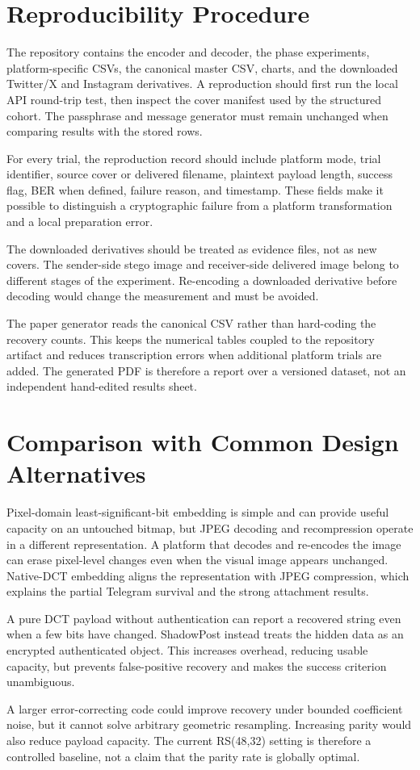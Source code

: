 \documentclass[conference]{IEEEtran}
\newcommand{\safeSection}[1]{\Needspace{5\baselineskip}\section{#1}}
\begin{document}
\safeSection{Reproducibility Procedure}
The repository contains the encoder and decoder, the phase experiments, platform-specific CSVs, the canonical master CSV, charts, and the downloaded Twitter/X and Instagram derivatives. A reproduction should first run the local API round-trip test, then inspect the cover manifest used by the structured cohort. The passphrase and message generator must remain unchanged when comparing results with the stored rows.

For every trial, the reproduction record should include platform mode, trial identifier, source cover or delivered filename, plaintext payload length, success flag, BER when defined, failure reason, and timestamp. These fields make it possible to distinguish a cryptographic failure from a platform transformation and a local preparation error.

The downloaded derivatives should be treated as evidence files, not as new covers. The sender-side stego image and receiver-side delivered image belong to different stages of the experiment. Re-encoding a downloaded derivative before decoding would change the measurement and must be avoided.

The paper generator reads the canonical CSV rather than hard-coding the recovery counts. This keeps the numerical tables coupled to the repository artifact and reduces transcription errors when additional platform trials are added. The generated PDF is therefore a report over a versioned dataset, not an independent hand-edited results sheet.

\safeSection{Comparison with Common Design Alternatives}
Pixel-domain least-significant-bit embedding is simple and can provide useful capacity on an untouched bitmap, but JPEG decoding and recompression operate in a different representation. A platform that decodes and re-encodes the image can erase pixel-level changes even when the visual image appears unchanged. Native-DCT embedding aligns the representation with JPEG compression, which explains the partial Telegram survival and the strong attachment results.

A pure DCT payload without authentication can report a recovered string even when a few bits have changed. ShadowPost instead treats the hidden data as an encrypted authenticated object. This increases overhead, reducing usable capacity, but prevents false-positive recovery and makes the success criterion unambiguous.

A larger error-correcting code could improve recovery under bounded coefficient noise, but it cannot solve arbitrary geometric resampling. Increasing parity would also reduce payload capacity. The current RS(48,32) setting is therefore a controlled baseline, not a claim that the parity rate is globally optimal.
\end{document}
